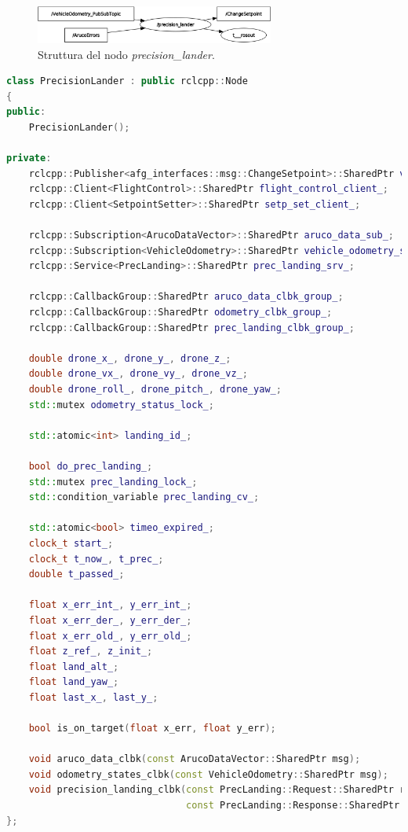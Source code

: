 \begin{figure}
    \centering
    \includegraphics[width=0.7\textwidth]{figs/chapter3/pland.png}
    \caption{Struttura del nodo \emph{precision\_lander}.}
    \label{fig:pland}
\end{figure}
\vspace{0.5cm}
\begin{lstlisting}[language=C++, caption={Definizione del nodo \emph{precision\_lander}.}, label={lst:pland}]
class PrecisionLander : public rclcpp::Node
{
public:
    PrecisionLander();

private:
    rclcpp::Publisher<afg_interfaces::msg::ChangeSetpoint>::SharedPtr vel_setp_pub_;
    rclcpp::Client<FlightControl>::SharedPtr flight_control_client_;
    rclcpp::Client<SetpointSetter>::SharedPtr setp_set_client_;

    rclcpp::Subscription<ArucoDataVector>::SharedPtr aruco_data_sub_;
    rclcpp::Subscription<VehicleOdometry>::SharedPtr vehicle_odometry_sub_;
    rclcpp::Service<PrecLanding>::SharedPtr prec_landing_srv_;

    rclcpp::CallbackGroup::SharedPtr aruco_data_clbk_group_;
    rclcpp::CallbackGroup::SharedPtr odometry_clbk_group_;
    rclcpp::CallbackGroup::SharedPtr prec_landing_clbk_group_;

    double drone_x_, drone_y_, drone_z_;
    double drone_vx_, drone_vy_, drone_vz_;
    double drone_roll_, drone_pitch_, drone_yaw_;
    std::mutex odometry_status_lock_;

    std::atomic<int> landing_id_;

    bool do_prec_landing_;
    std::mutex prec_landing_lock_;
    std::condition_variable prec_landing_cv_;

    std::atomic<bool> timeo_expired_;
    clock_t start_;
    clock_t t_now_, t_prec_;
    double t_passed_;

    float x_err_int_, y_err_int_;
    float x_err_der_, y_err_der_;
    float x_err_old_, y_err_old_;
    float z_ref_, z_init_;
    float land_alt_;
    float land_yaw_;
    float last_x_, last_y_;

    bool is_on_target(float x_err, float y_err);

    void aruco_data_clbk(const ArucoDataVector::SharedPtr msg);
    void odometry_states_clbk(const VehicleOdometry::SharedPtr msg);
    void precision_landing_clbk(const PrecLanding::Request::SharedPtr request,
                                const PrecLanding::Response::SharedPtr response);
};
\end{lstlisting}

